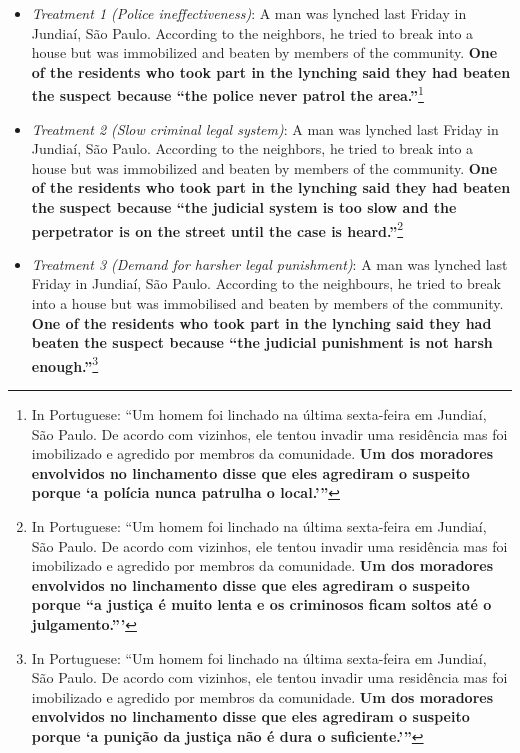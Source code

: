 \documentclass[12pt,ansiapaper]{article}
\providecommand{\tightlist}{%
   \setlength{\itemsep}{0pt}\setlength{\parskip}{0pt}}
\begin{document}
\begin{itemize}
\tightlist
\item
  \emph{Treatment 1 (Police ineffectiveness)}: A man was lynched last Friday in Jundiaí, São Paulo. According to the neighbors, he tried to break into a house but was immobilized and beaten by members of the community. \textbf{One of the residents who took part in the lynching said they had beaten the suspect because ``the police never patrol the area.''}\footnote{In Portuguese: ``Um homem foi linchado na última sexta-feira em Jundiaí, São Paulo. De acordo com vizinhos, ele tentou invadir uma residência mas foi imobilizado e agredido por membros da comunidade. \textbf{Um dos moradores envolvidos no linchamento disse que eles agrediram o suspeito porque `a polícia nunca patrulha o local.'''}}
\end{itemize}

\begin{itemize}
\tightlist
\item
  \emph{Treatment 2 (Slow criminal legal system)}: A man was lynched last Friday in Jundiaí, São Paulo. According to the neighbors, he tried to break into a house but was immobilized and beaten by members of the community. \textbf{One of the residents who took part in the lynching said they had beaten the suspect because ``the judicial system is too slow and the perpetrator is on the street until the case is heard.''}\footnote{In Portuguese: ``Um homem foi linchado na última sexta-feira em Jundiaí, São Paulo. De acordo com vizinhos, ele tentou invadir uma residência mas foi imobilizado e agredido por membros da comunidade. \textbf{Um dos moradores envolvidos no linchamento disse que eles agrediram o suspeito porque ``a justiça é muito lenta e os criminosos ficam soltos até o julgamento.'''}}
\end{itemize}

\begin{itemize}
\tightlist
\item
  \emph{Treatment 3 (Demand for harsher legal punishment)}: A man was lynched last Friday in Jundiaí, São Paulo. According to the neighbours, he tried to break into a house but was immobilised and beaten by members of the community. \textbf{One of the residents who took part in the lynching said they had beaten the suspect because ``the judicial punishment is not harsh enough.''}\footnote{In Portuguese: ``Um homem foi linchado na última sexta-feira em Jundiaí, São Paulo. De acordo com vizinhos, ele tentou invadir uma residência mas foi imobilizado e agredido por membros da comunidade. \textbf{Um dos moradores envolvidos no linchamento disse que eles agrediram o suspeito porque `a punição da justiça não é dura o suficiente.'''}}
\end{itemize}
\end{document}
